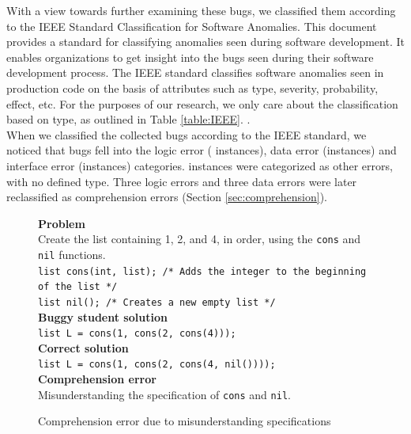 \documentclass{sig-alternate}
\begin{document}
With a view towards further examining these bugs, we classified them
according to the IEEE Standard Classification for Software Anomalies.
This document provides a standard for classifying anomalies seen
during software development. It enables organizations to get insight
into the bugs seen during their software development process. The IEEE
standard classifies software anomalies seen in production code on the
basis of attributes such as type, severity, probability, effect, etc.
For the purposes of our research, we only care about the
classification based on type, as outlined in Table \ref{table:IEEE}.
\cite{IEEE10}.\\

When we classified the collected bugs according to the IEEE standard,
we noticed that bugs fell into the logic error (\numlogicIEEE
instances), data error (\numdataIEEE instances) and interface error
(\numinterfaceIEEE instances) categories. \numotherIEEE instances were
categorized as other errors, with no defined type. Three logic errors
and three data errors were later reclassified as comprehension errors
(Section \ref{sec:comprehension}).\\

\begin{figure}
\begin{framed}
\setlength{\parindent}{0cm}
\textbf{Problem}\\
Create the list containing 1, 2, and 4, in order, using the \texttt{cons} and \texttt{nil} functions.\\

\texttt{list cons(int, list); /* Adds the integer to the beginning of the list */\\ list nil(); /* Creates a new empty list */}\\

\textbf{Buggy student solution}\\
\texttt{list L = cons(1, cons(2, cons(4)));}\\

\textbf{Correct solution}\\
\texttt{list L = cons(1, cons(2, cons(4, nil())));}\\

\textbf{Comprehension error}\\
Misunderstanding the specification of \texttt{cons} and \texttt{nil}.
\end{framed}
\vspace{-0.1in}
\caption{Comprehension error due to misunderstanding specifications}
\label{fig:comp1}
\end{figure}
\end{document}
